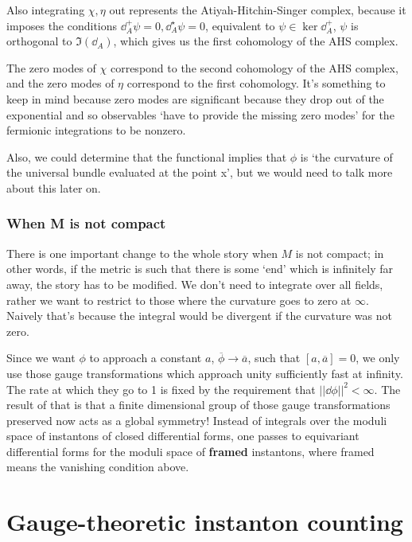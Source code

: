 \documentclass[leqno, openany]{memoir}
\theoremstyle{definition}
\theoremstyle{remark}
\theoremstyle{plain}
\theoremstyle{definition}
\theoremstyle{remark}
\begin{document}
Also integrating $\chi,\eta$ out represents the Atiyah-Hitchin-Singer complex, because it imposes the conditions $\dd_{A}^{+}\psi = 0, \dd_{A}^{\star} \psi = 0$, equivalent to $\psi \in \ker \dd_{A}^{+}$, $\psi$ is orthogonal to $\Im(\dd_{A})$, which gives us the first cohomology of the AHS complex.


The zero modes of $\chi$ correspond to the second cohomology of the AHS complex, and the zero modes of $\eta$ correspond to the first cohomology. It's something to keep in mind because zero modes are significant because they drop out of the exponential and so observables `have to provide the missing zero modes' for the fermionic integrations to be nonzero.


Also, we could determine that the functional implies that $\phi$ is `the curvature of the universal bundle evaluated at the point x', but we would need to talk more about this later on.

\subsection{When M is not compact}

There is one important change to the whole story when $M$ is not compact; in other words, if the metric is such that there is some `end' which is infinitely far away, the story has to be modified. We don't need to integrate over all fields, rather we want to restrict to those where the curvature goes to zero at $\infty$. Naively that's because the integral would be divergent if the curvature was not zero.

Since we want $\phi$ to approach a constant $a$, $\overline{\phi} \to \overline{a}$, such that $[a, \overline{a}]= 0$, we only use those gauge transformations which approach unity sufficiently fast at infinity. The rate at which they go to 1 is fixed by the requirement that $||\dd\phi||^{2} < \infty$. The result of that is that a finite dimensional group of those gauge transformations preserved now acts as a global symmetry! Instead of integrals over the moduli space of instantons of closed differential forms, one passes to equivariant differential forms for the moduli space of \textbf{framed} instantons, where framed means the vanishing condition above.

\chapter{Gauge-theoretic instanton counting}
\end{document}
